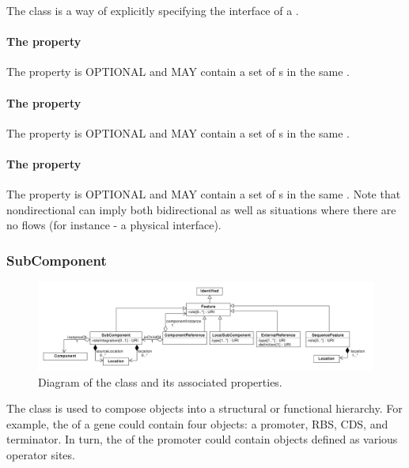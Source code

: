 The  class is a way of explicitly specifying the interface of a . 

\paragraph{The  property}
\label{sec:input:Interface}
The  property is OPTIONAL and MAY contain a set of  s in the same .
\paragraph{The  property}
\label{sec:output:Interface}
The  property is OPTIONAL and MAY contain a set of  s in the same .

\paragraph{The  property}
\label{sec:nondirectional:Interface}
The  property is OPTIONAL and MAY contain a set of  s in the same . Note that nondirectional can imply both bidirectional as well as situations where there are no flows (for instance - a physical interface).


\subsubsection{SubComponent}
\label{sec:SubComponent}

\begin{figure}[ht]
\begin{center}
\includegraphics[width=\textwidth]{uml/subcomponent}
\caption[]{Diagram of the  class and its associated properties.}
\label{uml:subcomponent}
\end{center}
\end{figure}

The  class is used to compose  objects into a structural or functional hierarchy. For example, the  of a gene could contain four  objects: a promoter, RBS, CDS, and terminator. In turn, the  of the promoter  could contain  objects defined as various operator sites.

